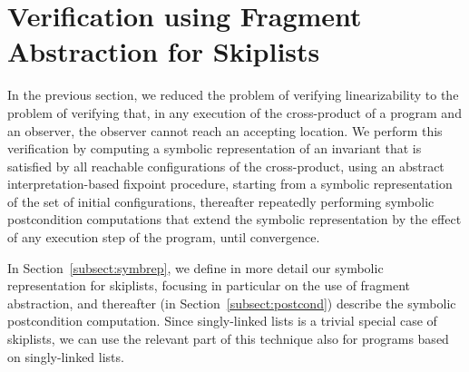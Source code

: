 \section{Verification using Fragment Abstraction for Skiplists}
\label{sec:fragment-abstraction}
In the previous section, we reduced the problem of verifying linearizability
to the problem of verifying
that, in any execution of the cross-product of a program and an observer, 
the observer cannot reach an accepting location.
We perform this verification by  computing a symbolic representation
of an invariant that is satisfied by all reachable configurations of the cross-product,
using an abstract interpretation-based fixpoint procedure, starting
from a symbolic representation of the set of initial configurations,
thereafter repeatedly performing
symbolic postcondition computations that extend the
symbolic representation by the effect of any execution step of the program,
until convergence.

In Section~\ref{subsect:symbrep}, we
define in more detail our symbolic representation for skiplists,
focusing in particular on the use of fragment abstraction, and thereafter
(in Section~\ref{subsect:postcond})
describe the symbolic postcondition computation.
Since singly-linked lists is a trivial special case of skiplists, we can use
the relevant part of this technique also for programs based on singly-linked
lists.




